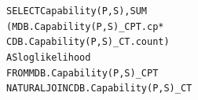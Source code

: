 \documentclass{IEEEtran}
\newcommand{\ct}{\mathit{ct}}
\begin{document}
\begin{alltt}
SELECT Capability(P,S),  SUM
(MDB.Capability(P,S)\_CPT.cp * \\CDB.Capability(P,S)\_CT.count) 
AS loglikelihood
FROM MDB.Capability(P,S)\_CPT 
NATURAL JOIN CDB.Capability(P,S)\_CT
\end{alltt}


%
%
\end{document}
